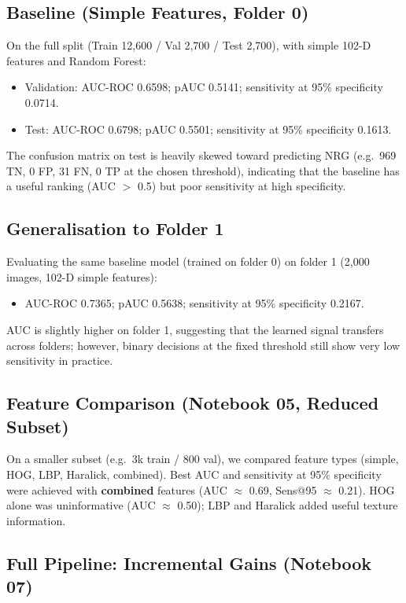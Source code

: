 \documentclass[11pt,a4paper]{article}
\begin{document}
\subsection{Baseline (Simple Features, Folder 0)}

On the full split (Train 12,600 / Val 2,700 / Test 2,700), with simple 102-D features and Random Forest:
\begin{itemize}
  \item Validation: AUC-ROC 0.6598; pAUC 0.5141; sensitivity at 95\% specificity 0.0714.
  \item Test: AUC-ROC 0.6798; pAUC 0.5501; sensitivity at 95\% specificity 0.1613.
\end{itemize}

The confusion matrix on test is heavily skewed toward predicting NRG (e.g.\ 969 TN, 0 FP, 31 FN, 0 TP at the chosen threshold), indicating that the baseline has a useful ranking (AUC $>$ 0.5) but poor sensitivity at high specificity.

\subsection{Generalisation to Folder 1}

Evaluating the same baseline model (trained on folder 0) on folder 1 (2,000 images, 102-D simple features):
\begin{itemize}
  \item AUC-ROC 0.7365; pAUC 0.5638; sensitivity at 95\% specificity 0.2167.
\end{itemize}

AUC is slightly higher on folder 1, suggesting that the learned signal transfers across folders; however, binary decisions at the fixed threshold still show very low sensitivity in practice.

\subsection{Feature Comparison (Notebook 05, Reduced Subset)}

On a smaller subset (e.g.\ 3k train / 800 val), we compared feature types (simple, HOG, LBP, Haralick, combined). Best AUC and sensitivity at 95\% specificity were achieved with \textbf{combined} features (AUC $\approx$ 0.69, Sens@95 $\approx$ 0.21). HOG alone was uninformative (AUC $\approx$ 0.50); LBP and Haralick added useful texture information.

\subsection{Full Pipeline: Incremental Gains (Notebook 07)}
\end{document}
